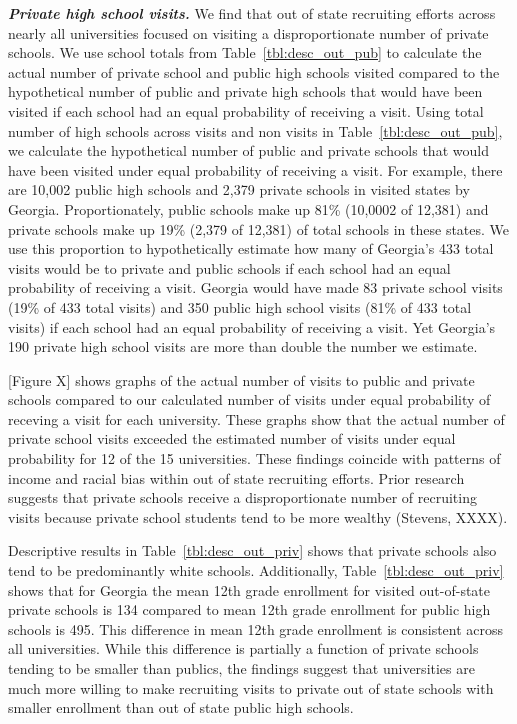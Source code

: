 \documentclass[twoside]{article}
\begin{document}
\textbf{\textit{Private high school visits.}} We find that out of state recruiting efforts across nearly all universities focused on visiting a disproportionate number of private schools. We use school totals from Table~\ref{tbl:desc_out_pub} to calculate the actual number of private school and public high schools visited compared to the hypothetical number of public and private high schools that would have been visited if each school had an equal probability of receiving a visit. Using total number of high schools across visits and non visits in Table~\ref{tbl:desc_out_pub}, we calculate the hypothetical number of public and private schools that would have been visited under equal probability of receiving a visit. For example, there are 10,002 public high schools and 2,379 private schools in visited states by Georgia. Proportionately, public schools  make up 81\%  (10,0002 of 12,381) and private schools make up 19\% (2,379 of 12,381) of total schools in these states. We use this proportion to hypothetically estimate how many of Georgia's 433 total visits would be to private and public schools if each school had an equal probability of receiving a visit. Georgia would have made 83 private school visits (19\% of 433 total visits) and 350 public high school visits (81\% of 433 total visits) if each school had an equal probability of receiving a visit. Yet Georgia’s 190 private high school visits are more than double the number we estimate. 

[Figure X] shows graphs of the actual number of visits to public and private schools compared to our calculated number of visits under equal probability of receving a visit for each university. These graphs show that the actual number of private school visits exceeded the estimated number of visits under equal probability for 12 of the 15 universities. These findings coincide with patterns of income and racial bias within out of state recruiting efforts. Prior research suggests that private schools receive a disproportionate number of recruiting visits because private school students tend to be more wealthy (Stevens, XXXX). 

Descriptive results in Table~\ref{tbl:desc_out_priv} shows that private schools also tend to be predominantly white schools. Additionally, Table~\ref{tbl:desc_out_priv} shows that for Georgia the mean 12th grade enrollment for visited out-of-state private schools is 134 compared to mean 12th grade enrollment for public high schools is 495. This difference in mean 12th grade enrollment is consistent across all universities. While this difference is partially a function of private schools tending to be smaller than publics, the findings suggest that universities are much more willing to make recruiting visits to private out of state schools with smaller enrollment than out of state public high schools. 
\end{document}
